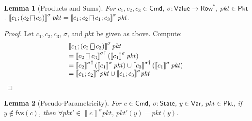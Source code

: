 \documentclass{article}
\newcommand{\pkt}{\mathit{pkt}}
\newcommand{\denote}[1]{\left\llbracket#1\right\rrbracket}
\newcommand{\Value}{\mathsf{Value}}
\newcommand{\Cmd}{\mathsf{Cmd}}
\newcommand{\Pkt}{\mathsf{Pkt}}
\newcommand{\Row}{\mathsf{Row}}
\newcommand{\Var}{\mathsf{Var}}
\newcommand{\State}{\mathsf{State}}
\newcommand{\choiceop}{\rotatebox[origin=c]{90}{$\sqsubset\!\!\!\sqsupset$}}
\newcommand{\choice}{\mathbin{\choiceop}}
\newcommand{\fvs}{\textrm{fvs}}
\newtheorem{lemma}{Lemma}
\begin{document}
\begin{lemma}[Products and Sums]
  \label{lem:prod-sum}
  For $c_1,c_2, c_3 \in \Cmd$, $\sigma : \Value \to \Row^*$, $\pkt \in \Pkt$.
  $\denote{c_1;(c_2 \choice c_3)}^\sigma\pkt = \denote{c_1;c_2 \choice
    c_1;c_3}^\sigma\pkt$.
\end{lemma}
\begin{proof}
  Let $c_1,c_2,c_3$, $\sigma$, and $\pkt$ be given as above. Compute:
  \[
  \begin{array}{ll}
  \denote{c_1;(c_2 \choice c_3)}^\sigma \pkt \\
  = {\denote{c_2 \choice c_3}^\sigma}^\dagger\left(\denote{c_1}^\sigma\pkt\right) \\
  = {\denote{c_2}^\sigma}^\dagger\left(\denote{c_1}^\sigma \pkt\right)
  \cup {\denote{c_3}^\sigma}^\dagger\left(\denote{c_1}^\sigma \pkt\right) \\
  = {\denote{c_1;c_2}^\sigma}\pkt\cup {\denote{c_1;c_3}^\sigma}\pkt
  \end{array}
  \]
\end{proof}


\begin{lemma}[Pseudo-Parametricity]
  \label{lem:parametricity}
  For $c \in \Cmd$, $\sigma : \State$, $y \in \Var$, $\pkt \in \Pkt$, if $y
  \not\in \fvs(c)$, then $\forall \pkt' \in \denote{c}^\sigma \pkt$, $\pkt'(y) =
  \pkt(y)$.
\end{lemma}
\end{document}
